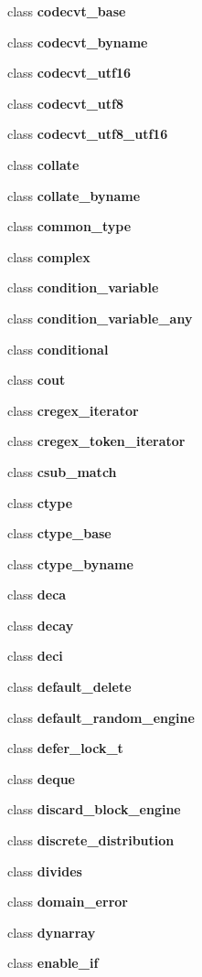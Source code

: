 \begin{DoxyCompactItemize}
\item 
class \textbf{ codecvt\+\_\+base}
\item 
class \textbf{ codecvt\+\_\+byname}
\item 
class \textbf{ codecvt\+\_\+utf16}
\item 
class \textbf{ codecvt\+\_\+utf8}
\item 
class \textbf{ codecvt\+\_\+utf8\+\_\+utf16}
\item 
class \textbf{ collate}
\item 
class \textbf{ collate\+\_\+byname}
\item 
class \textbf{ common\+\_\+type}
\item 
class \textbf{ complex}
\item 
class \textbf{ condition\+\_\+variable}
\item 
class \textbf{ condition\+\_\+variable\+\_\+any}
\item 
class \textbf{ conditional}
\item 
class \textbf{ cout}
\item 
class \textbf{ cregex\+\_\+iterator}
\item 
class \textbf{ cregex\+\_\+token\+\_\+iterator}
\item 
class \textbf{ csub\+\_\+match}
\item 
class \textbf{ ctype}
\item 
class \textbf{ ctype\+\_\+base}
\item 
class \textbf{ ctype\+\_\+byname}
\item 
class \textbf{ deca}
\item 
class \textbf{ decay}
\item 
class \textbf{ deci}
\item 
class \textbf{ default\+\_\+delete}
\item 
class \textbf{ default\+\_\+random\+\_\+engine}
\item 
class \textbf{ defer\+\_\+lock\+\_\+t}
\item 
class \textbf{ deque}
\item 
class \textbf{ discard\+\_\+block\+\_\+engine}
\item 
class \textbf{ discrete\+\_\+distribution}
\item 
class \textbf{ divides}
\item 
class \textbf{ domain\+\_\+error}
\item 
class \textbf{ dynarray}
\item 
class \textbf{ enable\+\_\+if}
\item 

\end{DoxyCompactItemize}
